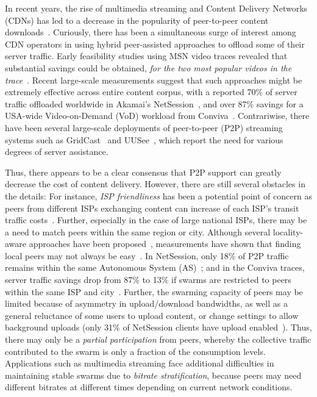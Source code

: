 \documentclass[10pt, conference, letterpaper]{IEEEtran}
\begin{document}
In recent years, the rise of multimedia streaming and Content Delivery Networks (CDNs) has led to a decrease in the popularity of peer-to-peer content downloads~\cite{labovitz2010internet}. Curiously, there has been a simultaneous surge of interest among CDN operators in using hybrid peer-assisted approaches to offload some of their server traffic. Early feasibility studies using MSN video traces revealed that substantial savings could be obtained, \emph{for the two most popular videos in the trace}~\cite{huang2007can}. Recent large-scale measurements suggest that such approaches might be extremely effective across entire content corpus, with a reported 70\% of server traffic offloaded worldwide in Akamai's NetSession~\cite{zhao2013peer}, and over 87\% savings for a USA-wide Video-on-Demand (VoD) workload from Conviva~\cite{balachandran2013analyzing}. Contrariwise, there have been several large-scale deployments of peer-to-peer (P2P) streaming systems such as GridCast~\cite{cheng2008gridcast} and UUSee~\cite{liu2010uusee}, which report the need for various degrees of server assistance. 

Thus, there appears to be a clear consensus that P2P support can greatly decrease the cost of content delivery. However, there are still several obstacles in the details: For instance, \emph{ISP friendliness} has been a potential point of concern as peers from  different ISPs exchanging content can increase of each ISP's transit traffic costs~\cite{karagiannis2005should}. Further, especially in the case of large national ISPs, there may be a need to match peers within the same region or city. Although several locality-aware approaches have been proposed~\cite{karagiannis2005should,xie2008p4p,choffnes2008taming,le2011pushing,cuevas2013bittorrent}, measurements have shown that finding local peers may not always be easy~\cite{piatek2009pitfalls}. In NetSession, only 18\% of P2P traffic remains within the same Autonomous System (AS)~\cite{zhao2013peer}; and in the Conviva traces, server traffic savings drop from 87\% to 13\% if swarms are restricted to peers within the same ISP and city~\cite{balachandran2013analyzing}. Further, the swarming capacity of peers may be limited because of asymmetry in upload/download bandwidths, as well as a general reluctance of some users to upload content, or change settings to allow background uploads (only 31\% of NetSession clients have upload enabled~\cite{zhao2013peer}). Thus, there may only be a \emph{partial participation} from peers, whereby the collective traffic contributed  to the swarm is only a fraction of the consumption levels. Applications such as multimedia streaming face additional difficulties in maintaining stable swarms due to \emph{bitrate stratification}, because peers may need different bitrates at different times depending on current network conditions. 
\end{document}
